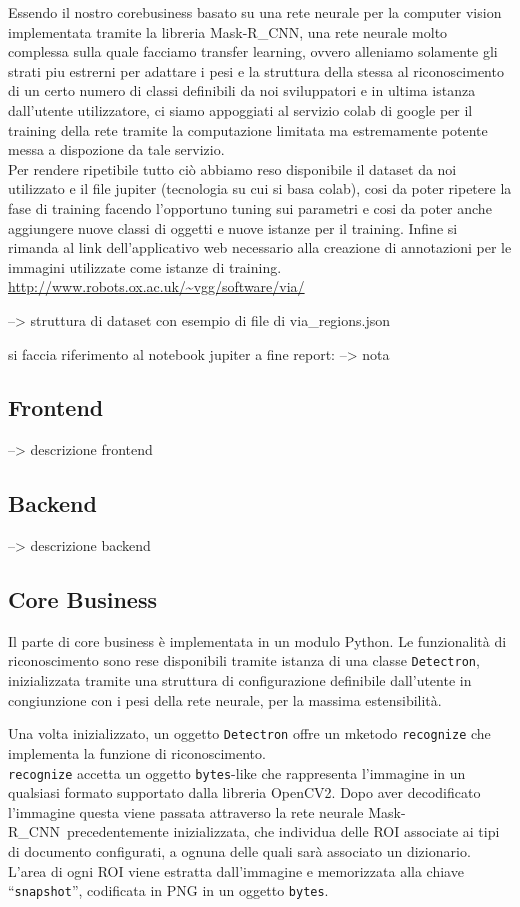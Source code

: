\documentclass[12pt,a4paper]{article}
\newcommand{\mrcnn}{Mask-R\_CNN}
\begin{document}
Essendo il nostro corebusiness basato su una rete neurale per la
computer vision implementata tramite la libreria \mrcnn, una rete
neurale molto complessa sulla quale facciamo transfer learning, ovvero
alleniamo solamente gli strati piu estrerni per adattare i pesi e la
struttura della stessa al riconoscimento di un certo numero di classi
definibili da noi sviluppatori e in ultima istanza dall'utente
utilizzatore, ci siamo appoggiati al servizio colab di google per il
training della rete tramite la computazione limitata ma estremamente
potente messa a dispozione da tale servizio.\\
Per rendere ripetibile tutto ciò abbiamo reso disponibile il dataset da
noi utilizzato e il file jupiter (tecnologia su cui si basa colab), cosi
da poter ripetere la fase di training facendo l'opportuno tuning sui
parametri e cosi da poter anche aggiungere nuove classi di oggetti e
nuove istanze per il training. Infine si rimanda al link
dell'applicativo web necessario alla creazione di annotazioni per le
immagini utilizzate come istanze di training.
\url{http://www.robots.ox.ac.uk/~vgg/software/via/}

--> struttura di dataset con esempio di file di via\_regions.json

si faccia riferimento al notebook jupiter a fine report: --> nota %

\subsection{Frontend}

--> descrizione frontend

\subsection{Backend}

--> descrizione backend

\subsection{Core Business}

Il parte di core business è implementata in un modulo Python. Le
funzionalità di riconoscimento sono rese disponibili tramite istanza di
una classe \texttt{Detectron}, inizializzata tramite una struttura di
configurazione definibile dall'utente in congiunzione con i pesi della
rete neurale, per la massima estensibilità.

Una volta inizializzato, un oggetto \texttt{Detectron} offre un mketodo
\texttt{recognize} che implementa la funzione di riconoscimento.\\
\texttt{recognize} accetta un oggetto \texttt{bytes}-like che
rappresenta l'immagine in un qualsiasi formato supportato dalla libreria
OpenCV2. Dopo aver decodificato l'immagine questa viene passata
attraverso la rete neurale \mrcnn\ precedentemente inizializzata, che
individua delle ROI associate ai tipi di documento configurati, a ognuna
delle quali sarà associato un dizionario. L'area di ogni ROI viene
estratta dall'immagine e memorizzata alla chiave ``\texttt{snapshot}'',
codificata in PNG in un oggetto \texttt{bytes}.
\end{document}

